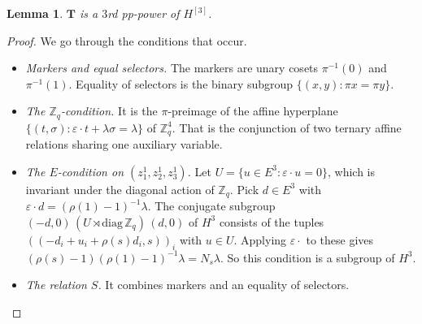 \documentclass[11pt]{article}
\newtheorem{lemma}[theorem]{Lemma}
\theoremstyle{definition}
\theoremstyle{remark}
\newcommand{\Z}{\mathbb Z}
\begin{document}
\begin{lemma}\label{lem:Tpp}
$\mathbf T$ is a $3$rd pp-power of $H^{[3]}$.
\end{lemma}
\begin{proof}
We go through the conditions that occur.
\begin{itemize}
\item \emph{Markers and equal selectors.} The markers are unary cosets
$\pi^{-1}(0)$ and $\pi^{-1}(1)$. Equality of selectors is the binary subgroup
$\{(x,y):\pi x=\pi y\}$.
\item \emph{The $\Z_q$-condition.} It is the $\pi$-preimage of the affine
hyperplane $\{(t,\sigma):\varepsilon\cdot t+\lambda\sigma=\lambda\}$ of $\Z_q^4$.
That is the conjunction of two ternary affine relations sharing one auxiliary
variable.
\item \emph{The $E$-condition on $(z^1_1,z^1_2,z^1_3)$.} Let $U=\{u\in
E^3:\varepsilon\cdot u=0\}$, which is invariant under the diagonal action of
$\Z_q$. Pick $d\in E^3$ with $\varepsilon\cdot d=(\rho(1)-1)^{-1}\lambda$. The
conjugate subgroup $(-d,0)\,(U\rtimes\mathrm{diag}\,\Z_q)\,(d,0)$ of $H^3$
consists of the tuples $((-d_i+u_i+\rho(s)d_i,s))_i$ with $u\in U$. Applying
$\varepsilon\cdot$ to these gives
$(\rho(s)-1)(\rho(1)-1)^{-1}\lambda=N_s\lambda$. So this condition is a subgroup
of $H^3$.
\item \emph{The relation $S$.} It combines markers and an equality of selectors.
\end{itemize}
\end{proof}
\end{document}
